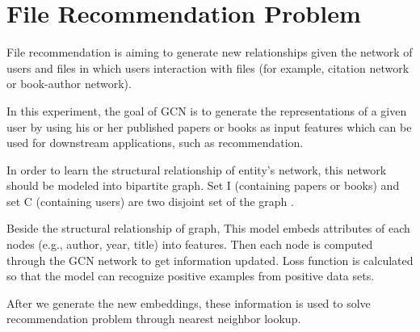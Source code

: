 \vspace{-1ex}
\section{File Recommendation Problem}
\label{sec-def1, for GCN recommendation problem}

File recommendation is aiming to generate new relationships given the network of users and files in which users interaction with files (for example, citation network or book-author network).

In this experiment, the goal of GCN is to generate the representations of a given user by using his or her published papers or books as input features which can be used for downstream applications, such as recommendation.

In order to learn the structural relationship of entity's network, this network should be modeled into bipartite graph. Set I (containing papers or books) and set C (containing users) are two disjoint set of the graph \cite{pintest}. 

Beside the structural relationship of graph, This model embeds attributes of each nodes (e.g., author, year, title) into features. Then each node is computed through the GCN network to get information updated. Loss function is calculated so that the model can recognize positive examples from positive data sets. 

After we generate the new embeddings, these information is used to solve recommendation problem through nearest neighbor lookup.